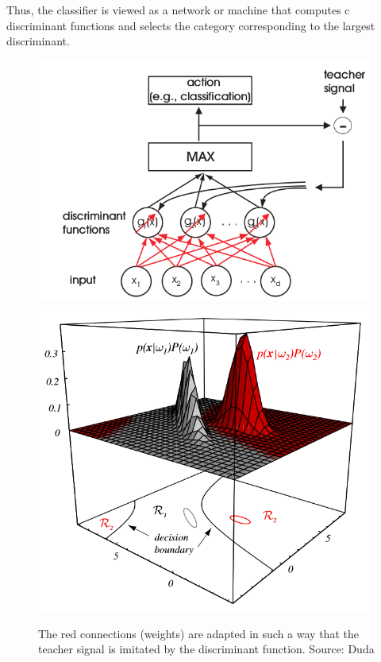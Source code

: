 \documentclass[MachineLearning]{subfiles}
\begin{document}
Thus, the classifier is viewed as a network or machine that computes c discriminant
functions and selects the category corresponding to the largest discriminant.
\begin{figure}[H]
\centering
\includegraphics[width=0.47\linewidth]{figs/Adaptive-Discriminant-functions.png}
\includegraphics[width=0.47\linewidth]{figs/DF-decision-boundaries.png}
\caption{The red connections (weights) are adapted in such a way that the
teacher signal is imitated by the discriminant function. Source: Duda}
\end{figure}
\end{document}
